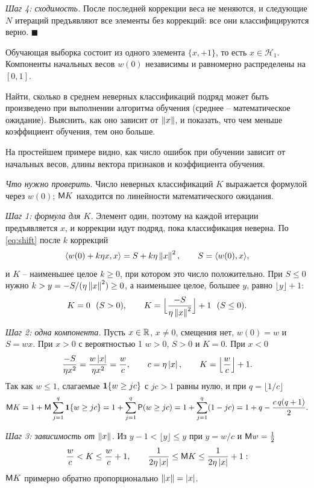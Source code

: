 \documentclass[12pt,a4paper]{article}
\begin{document}
\emph{Шаг 4: сходимость.} После последней коррекции веса не меняются, и следующие
$N$ итераций предъявляют все элементы без коррекций: все они классифицируются
верно. $\blacksquare$

\dano Обучающая выборка состоит из одного элемента $\{x, +1\}$, то есть
$x \in \mathcal{H}_1$. Компоненты начальных весов $w(0)$ независимы и
равномерно распределены на $[0, 1]$.

\treb Найти, сколько в среднем неверных классификаций подряд может быть
произведено при выполнении алгоритма обучения (среднее -- математическое
ожидание). Выяснить, как оно зависит от $\left\lVert x \right\rVert$, и показать, что чем меньше
коэффициент обучения, тем оно больше.

\zachem На простейшем примере видно, как число ошибок при обучении зависит от
начальных весов, длины вектора признаков и коэффициента обучения.

\resh \emph{Что нужно проверить.} Число неверных классификаций $K$ выражается
формулой через $w(0)$; $\mathsf{M} K$ находится по линейности математического
ожидания.

\emph{Шаг 1: формула для $K$.} Элемент один, поэтому на каждой итерации
предъявляется $x$, и коррекции идут подряд, пока классификация неверна. По
\eqref{eq:shift} после $k$ коррекций
\[
  \langle w(0) + k\eta x, x\rangle = S + k\eta\left\lVert x \right\rVert^2,
  \qquad
  S = \langle w(0), x\rangle ,
\]
и $K$ -- наименьшее целое $k \ge 0$, при котором это число положительно. При
$S \le 0$ нужно $k > y = -S/(\eta\left\lVert x \right\rVert^2) \ge 0$, а наименьшее целое,
большее $y$, равно $\lfloor y\rfloor + 1$:
\[
  K = 0 \ \ (S > 0),
  \qquad
  K = \Bigl\lfloor \frac{-S}{\eta\left\lVert x \right\rVert^2}\Bigr\rfloor + 1 \ \ (S \le 0) .
\]

\emph{Шаг 2: одна компонента.} Пусть $x \in \mathbb{R}$, $x \ne 0$, смещения нет,
$w(0) = w$ и $S = wx$. При $x > 0$ с вероятностью 1 $w > 0$, $S > 0$ и $K = 0$.
При $x < 0$
\[
  \frac{-S}{\eta x^2} = \frac{w\left\lvert x \right\rvert}{\eta x^2} = \frac{w}{c},
  \qquad
  c = \eta\left\lvert x \right\rvert,
  \qquad
  K = \Bigl\lfloor \frac{w}{c}\Bigr\rfloor + 1 .
\]
Так как $w \le 1$, слагаемые $\mathbf{1}\{w \ge jc\}$ с $jc > 1$ равны нулю, и при
$q = \lfloor 1/c\rfloor$
\[
  \mathsf{M} K = 1 + \mathsf{M}\sum_{j=1}^{q}\mathbf{1}\{w \ge jc\}
         = 1 + \sum_{j=1}^{q}\mathsf{P}(w \ge jc)
         = 1 + \sum_{j=1}^{q}(1 - jc)
         = 1 + q - \frac{c\,q(q+1)}{2} .
\]

\emph{Шаг 3: зависимость от $\left\lVert x \right\rVert$.} Из $y - 1 < \lfloor y\rfloor \le y$ при
$y = w/c$ и $\mathsf{M} w = \frac12$
\[
  \frac{w}{c} < K \le \frac{w}{c} + 1,
  \qquad
  \frac{1}{2\eta\left\lvert x \right\rvert} \le \mathsf{M} K \le \frac{1}{2\eta\left\lvert x \right\rvert} + 1 :
\]
$\mathsf{M} K$ примерно обратно пропорционально $\left\lVert x \right\rVert = \left\lvert x \right\rvert$.
\end{document}
